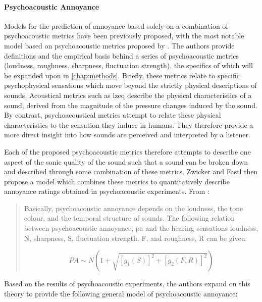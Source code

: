 \paragraph*{Psychoacoustic Annoyance }Models for the prediction of annoyance based solely on a combination of psychoacoustic metrics have been previously proposed, with the most notable model based on psychoacoustic metrics proposed by \citet{PsychoacousticsfactsmodelsZwicker}. The authors provide definitions and the empirical basis behind a series of psychoacoustic metrics (loudness, roughness, sharpness, fluctuation strength), the specifics of which will be expanded upon in \cref{chap:methods}. Briefly, these metrics relate to specific psychophysical sensations which move beyond the strictly physical descriptions of sounds. Acoustical metrics such as \gls{lzeq} describe the physical characteristics of a sound, derived from the magnitude of the pressure changes induced by the sound. By contrast, psychoacoustical metrics attempt to relate these physical characteristics to the sensation they induce in humans. They therefore provide a more direct insight into how sounds are perceived and interpreted by a listener. 

Each of the proposed psychoacoustic metrics therefore attempts to describe one aspect of the sonic quality of the sound such that a sound can be broken down and described through some combination of these metrics. Zwicker and Fastl then propose a model which combines these metrics to quantitatively describe annoyance ratings obtained in psychoacoustic experiments. From \citet[p. 327]{PsychoacousticsfactsmodelsZwicker}:

\begin{quotation}
  Basically, psychoacoustic annoyance depends on the loudness, the tone colour, and the temporal structure of sounds. The following relation between psychoacoustic annoyance, \gls{pa} and the hearing sensations loudness, N, sharpness, S, fluctuation strength, F, and roughness, R can be given:

  \begin{equation}
    \label{eqn:pa1}
    PA \sim N( 1 + \sqrt{[g_1(S)]^2 + [g_2(F, R)]^2})
  \end{equation}

\end{quotation}


Based on the results of psychoacoustic experiments, the authors expand on this theory to provide the following general model of psychoacoustic annoyance:

